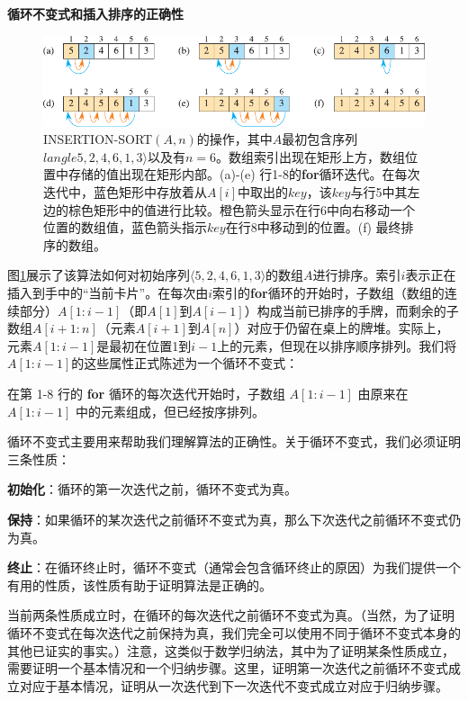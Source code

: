 \documentclass[lang=cn,newtx,10pt,scheme=chinese]{elegantbook}
\begin{document}
\textbf{循环不变式和插入排序的正确性}

\begin{figure}[htbp]
    \centering
    \includegraphics{算法导论第四版插图/第二章/插入排序过程示意图.pdf}
    \caption{INSERTION-SORT$(A,n)$的操作，其中$A$最初包含序列$langle 5,2,4,6,1,3 \rangle$以及有$n = 6$。数组索引出现在矩形上方，数组位置中存储的值出现在矩形内部。(a)-(e) 行1-8的\textbf{for}循环迭代。在每次迭代中，蓝色矩形中存放着从$A[i]$中取出的$key$，该$key$与行5中其左边的棕色矩形中的值进行比较。橙色箭头显示在行6中向右移动一个位置的数组值，蓝色箭头指示$key$在行8中移动到的位置。(f) 最终排序的数组。}
    \label{fig:插入排序过程示意图}
\end{figure}

图\ref{fig:插入排序过程示意图}展示了该算法如何对初始序列$\langle 5,2,4,6,1,3\rangle$的数组$A$进行排序。索引$i$表示正在插入到手中的``当前卡片''。在每次由$i$索引的\textbf{for}循环的开始时，子数组（数组的连续部分）$A[1:i-1]$（即$A[1]$到$A[i-1]$）构成当前已排序的手牌，而剩余的子数组$A[i+1:n]$（元素$A[i+1]$到$A[n]$）对应于仍留在桌上的牌堆。实际上，元素$A[1:i-1]$是最初在位置1到$i-1$上的元素，但现在以排序顺序排列。我们将$A[1:i-1]$的这些属性正式陈述为一个循环不变式：

\begin{tcolorbox}
在第 1-8 行的 \textbf{for} 循环的每次迭代开始时，子数组 $A[1:i-1]$ 由原来在 $A[1:i-1]$ 中的元素组成，但已经按序排列。
\end{tcolorbox}

循环不变式主要用来帮助我们理解算法的正确性。关于循环不变式，我们必须证明三条性质：

\textbf{初始化}：循环的第一次迭代之前，循环不变式为真。

\textbf{保持}：如果循环的某次迭代之前循环不变式为真，那么下次迭代之前循环不变式仍为真。

\textbf{终止}：在循环终止时，循环不变式（通常会包含循环终止的原因）为我们提供一个有用的性质，该性质有助于证明算法是正确的。

当前两条性质成立时，在循环的每次迭代之前循环不变式为真。（当然，为了证明循环不变式在每次迭代之前保持为真，我们完全可以使用不同于循环不变式本身的其他已证实的事实。）注意，这类似于数学归纳法，其中为了证明某条性质成立，需要证明一个基本情况和一个归纳步骤。这里，证明第一次迭代之前循环不变式成立对应于基本情况，证明从一次迭代到下一次迭代不变式成立对应于归纳步骤。
\end{document}

